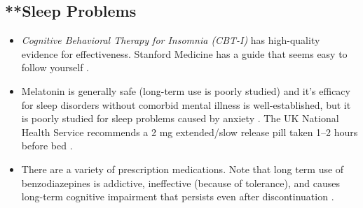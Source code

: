 \documentclass[12pt,letterpaper]{book}
\begin{document}
\subsection*{**Sleep Problems}
\begin{itemize}
    \item \textit{Cognitive Behavioral Therapy for Insomnia (CBT-I)} has high-quality evidence for effectiveness. Stanford Medicine has a guide that seems easy to follow yourself \cite{stanfordSleep}.
    \item Melatonin is generally safe (long-term use is poorly studied) and it's efficacy for sleep disorders without comorbid mental illness is well-established, but it is poorly studied for sleep problems caused by anxiety \cite{moon2022role}. The UK National Health Service recommends a 2 mg extended/slow release pill taken 1–2 hours before bed \cite{nhsMelatonin}.
    \item There are a variety of prescription medications. Note that long term use of benzodiazepines is addictive, ineffective (because of tolerance), and causes long-term cognitive impairment that persists even after discontinuation \cite{barkerBenzo}.
\end{itemize}
\end{document}
